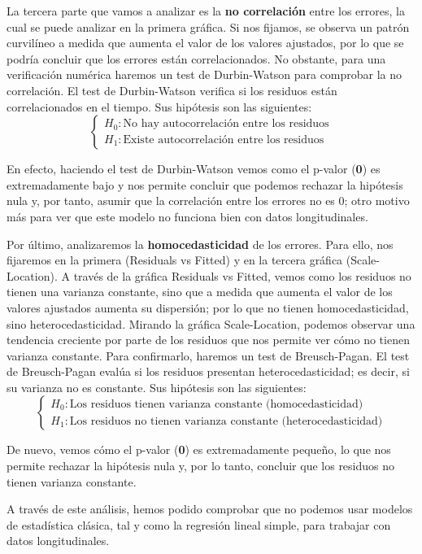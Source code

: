 \documentclass[
  letterpaper,
  DIV=11,
  numbers=noendperiod]{scrreprt}
\begin{document}
La tercera parte que vamos a analizar es la \textbf{no correlación}
entre los errores, la cual se puede analizar en la primera gráfica. Si
nos fijamos, se observa un patrón curvilíneo a medida que aumenta el
valor de los valores ajustados, por lo que se podría concluir que los
errores están correlacionados. No obstante, para una verificación
numérica haremos un test de Durbin-Watson para comprobar la no
correlación. El test de Durbin-Watson verifica si los residuos están
correlacionados en el tiempo. Sus hipótesis son las siguientes: \[
\begin{cases} 
H_0 : \text{No hay autocorrelación entre los residuos} \\ 
H_1 : \text{Existe autocorrelación entre los residuos}
\end{cases}
\]

En efecto, haciendo el test de Durbin-Watson vemos como el p-valor
(\textbf{0}) es extremadamente bajo y nos permite concluir que podemos
rechazar la hipótesis nula y, por tanto, asumir que la correlación entre
los errores no es 0; otro motivo más para ver que este modelo no
funciona bien con datos longitudinales.

Por último, analizaremos la \textbf{homocedasticidad} de los errores.
Para ello, nos fijaremos en la primera (Residuals vs Fitted) y en la
tercera gráfica (Scale-Location). A través de la gráfica Residuals vs
Fitted, vemos como los residuos no tienen una varianza constante, sino
que a medida que aumenta el valor de los valores ajustados aumenta su
dispersión; por lo que no tienen homocedasticidad, sino
heterocedasticidad. Mirando la gráfica Scale-Location, podemos observar
una tendencia creciente por parte de los residuos que nos permite ver
cómo no tienen varianza constante. Para confirmarlo, haremos un test de
Breusch-Pagan. El test de Breusch-Pagan evalúa si los residuos presentan
heterocedasticidad; es decir, si su varianza no es constante. Sus
hipótesis son las siguientes: \[
\begin{cases} 
H_0 : \text{Los residuos tienen varianza constante (homocedasticidad)} \\ 
H_1 : \text{Los residuos no tienen varianza constante (heterocedasticidad)}
\end{cases}
\]

De nuevo, vemos cómo el p-valor (\textbf{0}) es extremadamente pequeño,
lo que nos permite rechazar la hipótesis nula y, por lo tanto, concluir
que los residuos no tienen varianza constante.

A través de este análisis, hemos podido comprobar que no podemos usar
modelos de estadística clásica, tal y como la regresión lineal simple,
para trabajar con datos longitudinales.
\end{document}
